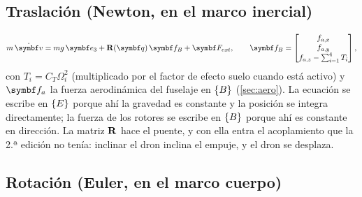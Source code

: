 \subsection{Traslación (Newton, en el marco inercial)}

\begin{equation}
m\,\dot{\vect v} = m g\,\eu + \R(\vect q)\,\vect f_B + \vect F_{ext},
\qquad
\vect f_B = \begin{bmatrix} f_{a,x}\\ f_{a,y}\\ f_{a,z} - \sum_{i=1}^4 T_i\end{bmatrix},
\label{eq:newton}
\end{equation}
con $T_i = C_T\Omega_i^2$ (multiplicado por el factor de efecto suelo cuando
está activo) y $\vect f_a$ la fuerza aerodinámica del fuselaje en $\{B\}$
(\cref{sec:aero}). La ecuación se escribe en $\{E\}$ porque ahí la gravedad es
constante y la posición se integra directamente; la fuerza de los rotores
se escribe en $\{B\}$ porque ahí es constante en dirección. La matriz $\mathbf{R}$ hace
el puente, y con ella entra el acoplamiento que la 2.ª edición no tenía:
inclinar el dron inclina el empuje, y el dron se desplaza.

\subsection{Rotación (Euler, en el marco cuerpo)}

